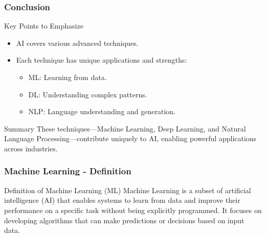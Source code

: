 \documentclass{beamer}
\begin{document}
\begin{frame}[fragile]
    \frametitle{Conclusion}
    \begin{block}{Key Points to Emphasize}
        \begin{itemize}
            \item AI covers various advanced techniques.
            \item Each technique has unique applications and strengths:
                \begin{itemize}
                    \item ML: Learning from data.
                    \item DL: Understanding complex patterns.
                    \item NLP: Language understanding and generation.
                \end{itemize}
        \end{itemize}
    \end{block}
    
    \begin{block}{Summary}
        These techniques—Machine Learning, Deep Learning, and Natural Language Processing—contribute uniquely to AI, enabling powerful applications across industries.
    \end{block}
\end{frame}

\begin{frame}[fragile]
    \frametitle{Machine Learning - Definition}
    
    \begin{block}{Definition of Machine Learning (ML)}
        Machine Learning is a subset of artificial intelligence (AI) that enables systems to learn from data and improve their performance on a specific task without being explicitly programmed. It focuses on developing algorithms that can make predictions or decisions based on input data.
    \end{block}
\end{frame}
\end{document}
